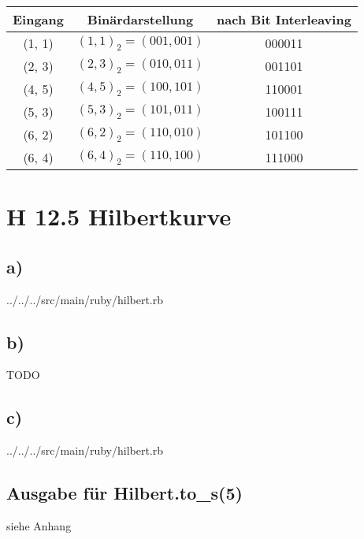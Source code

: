 \documentclass[a4paper]{article}
\begin{document}
\begin{tabular}[h!]{|c|c|c|}
	\hline
	Eingang & Binärdarstellung & nach Bit Interleaving \\
	\hline
	(1, 1) & $(1,1)_2 = (001,001)$ & 000011 \\
	(2, 3) & $(2,3)_2 = (010,011)$ & 001101 \\
	(4, 5) & $(4,5)_2 = (100,101)$ & 110001 \\
	(5, 3) & $(5,3)_2 = (101,011)$ & 100111 \\
	(6, 2) & $(6,2)_2 = (110,010)$ & 101100 \\
	(6, 4) & $(6,4)_2 = (110,100)$ & 111000 \\
	\hline
\end{tabular}

\clearpage
\section*{H 12.5 Hilbertkurve}

\subsection*{a)}


				 {../../../src/main/ruby/hilbert.rb}

\subsection*{b)}
TODO

\subsection*{c)}


				 {../../../src/main/ruby/hilbert.rb}

\subsection*{Ausgabe für Hilbert.to\_s(5)}

siehe Anhang
\end{document}
